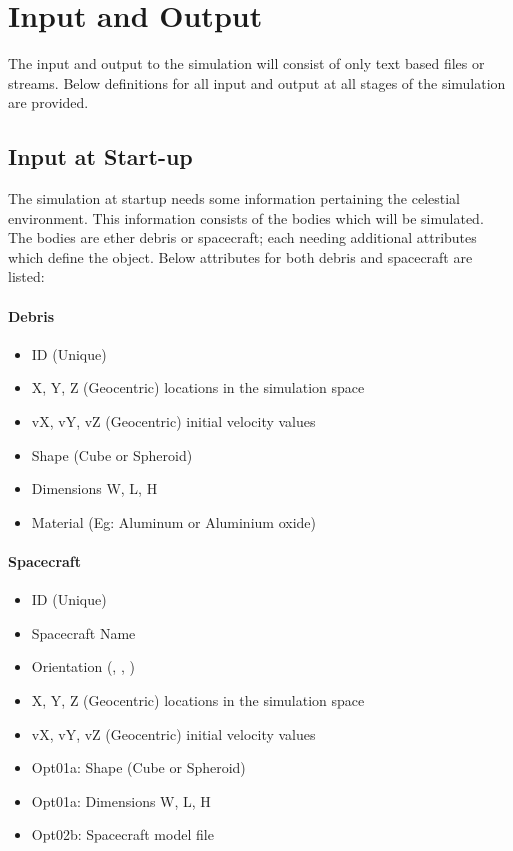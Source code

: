 \documentclass{article}
\begin{document}
  \section{Input and Output}
  
The input and output to the simulation will consist of only text based files or streams. Below definitions for all input and output at all stages of the simulation are provided. 
  
  \subsection{Input at Start-up}
  
  The simulation at startup needs some information pertaining the celestial environment. This information consists of the bodies which will be simulated. The bodies are ether debris or spacecraft; each needing additional attributes which define the object. Below attributes for both debris and spacecraft are listed:
  
  \paragraph{Debris}
  \begin{itemize}
  	\item ID (Unique)
  	\item X, Y, Z (Geocentric) locations in the simulation space
  	\item vX, vY, vZ (Geocentric) initial velocity values
  	\item Shape (Cube or Spheroid)
  	\item Dimensions W, L, H
  	\item Material (Eg: Aluminum or Aluminium oxide)
  \end{itemize}
  
  \paragraph{Spacecraft}
  \begin{itemize}
    	\item ID (Unique)
    	\item Spacecraft Name
    	\item Orientation (\textalpha, \textbeta, \textgamma)
  	\item X, Y, Z (Geocentric) locations in the simulation space
  	\item vX, vY, vZ (Geocentric) initial velocity values
  	\item Opt01a: Shape (Cube or Spheroid)
  	\item Opt01a: Dimensions W, L, H
  	\item Opt02b: Spacecraft model file
  \end{itemize}
  
\end{document}
